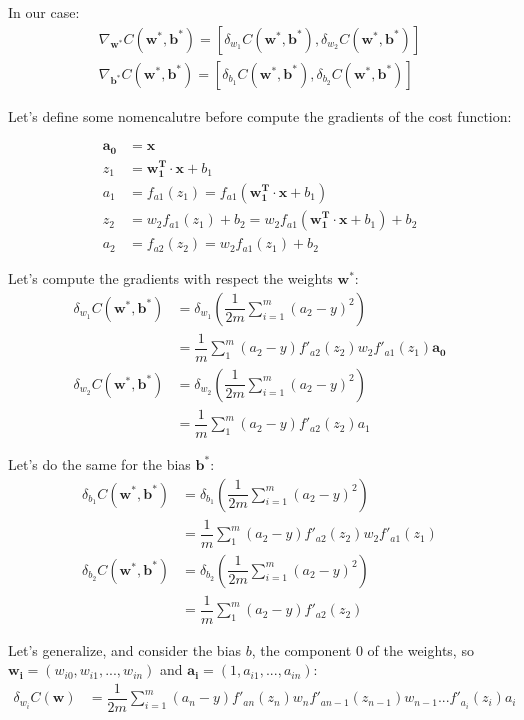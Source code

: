 \documentclass{article}
\begin{document}
In our case:
\begin{align}
  \nabla_{\mathbf{w^*}}C(\mathbf{w^*}, \mathbf{b^*}) = [\delta_{w_1} C(\mathbf{w^*}, \mathbf{b^*}), \delta_{w_2} C(\mathbf{w^*}, \mathbf{b^*})]  \\
  \nabla_{\mathbf{b^*}}C(\mathbf{w^*}, \mathbf{b^*}) = [\delta_{b_1} C(\mathbf{w^*}, \mathbf{b^*}), \delta_{b_2} C(\mathbf{w^*}, \mathbf{b^*})]
\end{align}

Let's define some nomencalutre before compute the gradients of the cost function:

\begin{align}
  \mathbf{a_0} &= \mathbf{x} \\ 
  z_1 &= \mathbf{w_1^T} \cdot \mathbf{x} + b_1 \\
  a_1 &= f_{a1}(z_1) = f_{a1}(\mathbf{w_1^T} \cdot \mathbf{x} + b_1) \\
  z_2 &= w_2 f_{a1}(z_1) + b_2 = w_2 f_{a1}(\mathbf{w_1^T} \cdot \mathbf{x} + b_1) + b_2 \\
  a_2 &= f_{a2}(z_2) = w_2 f_{a1}(z_1) + b_2
\end{align}

Let's compute the gradients with respect the weights $\mathbf{w^*}$:
\begin{align}
  \delta_{w_1} C(\mathbf{w^*}, \mathbf{b^*}) &= \delta_{w_1} ( \dfrac{1}{2m} \sum_{i=1}^m (a_2 - y)^2) \nonumber \\
  &= \dfrac{1}{m} \sum_1^m (a_2 - y) f'_{a2}(z_2) w_2 f'_{a1}(z_1) \mathbf{a_0} \\
  \delta_{w_2} C(\mathbf{w^*}, \mathbf{b^*}) &= \delta_{w_2} ( \dfrac{1}{2m} \sum_{i=1}^m (a_2 - y)^2) \nonumber \\
  &= \dfrac{1}{m} \sum_1^m (a_2 - y) f'_{a2}(z_2) a_1 
\end{align}

Let's do the same for the bias $\mathbf{b^*}$:
\begin{align}
  \delta_{b_1} C(\mathbf{w^*}, \mathbf{b^*}) &= \delta_{b_1} ( \dfrac{1}{2m} \sum_{i=1}^m (a_2 - y)^2) \nonumber \\
  &= \dfrac{1}{m} \sum_1^m (a_2 - y) f'_{a2}(z_2) w_2 f'_{a1}(z_1) \\
  \delta_{b_2} C(\mathbf{w^*}, \mathbf{b^*}) &= \delta_{b_2} ( \dfrac{1}{2m} \sum_{i=1}^m (a_2 - y)^2) \nonumber \\
  &= \dfrac{1}{m} \sum_1^m (a_2 - y) f'_{a2}(z_2)
\end{align}

Let's generalize, and consider the bias $b$, the component $0$ of the weights, so $\mathbf{w_i} = (w_{i0}, w_{i1}, ..., w_{in})$ and $\mathbf{a_i} = (1, a_{i1}, ..., a_{in})$:
\begin{align}
  \delta_{w_i} C(\mathbf{w}) &= \dfrac{1}{2m} \sum_{i=1}^m (a_n - y) f'_{an}(z_n) w_n f'_{an-1}(z_{n-1}) w_{n-1} ... f'_{a_i}(z_i) a_i
\end{align}
\end{document}
